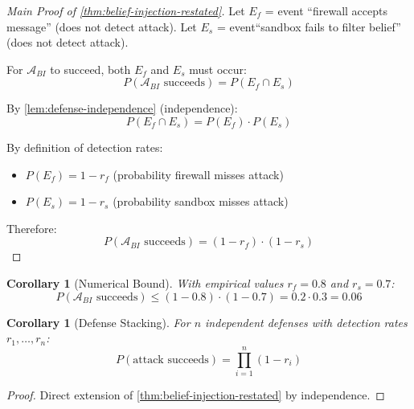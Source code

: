 \documentclass[
]{article}
\newtheorem{corollary}[theorem]{Corollary}
\begin{document}
\begin{proof}[Main Proof of \cref{thm:belief-injection-restated}]
Let $E_f$ = event ``firewall accepts message'' (does not detect attack). Let $E_s$ = event``sandbox fails to filter belief'' (does not detect attack).

For $\mathcal{A}_{BI}$ to succeed, both $E_f$ and $E_s$ must occur:
\begin{equation}
\label{eq:61-proof-1}
P(\mathcal{A}_{BI} \text{ succeeds}) = P(E_f \cap E_s)
\end{equation}

By \cref{lem:defense-independence} (independence):
\begin{equation}
\label{eq:61-proof-2}
P(E_f \cap E_s) = P(E_f) \cdot P(E_s)
\end{equation}

By definition of detection rates:
\begin{itemize}
\item $P(E_f) = 1 - r_f$ (probability firewall misses attack)
\item $P(E_s) = 1 - r_s$ (probability sandbox misses attack)
\end{itemize}

Therefore:
\begin{equation}
\label{eq:61-proof-3}
P(\mathcal{A}_{BI} \text{ succeeds}) = (1 - r_f) \cdot (1 - r_s)
\end{equation}
\end{proof}

\begin{corollary}[Numerical Bound]
\label{cor:numerical-bound}
With empirical values $r_f = 0.8$ and $r_s = 0.7$:
\begin{equation}
\label{eq:numerical-bound}
P(\mathcal{A}_{BI} \text{ succeeds}) \leq (1 - 0.8) \cdot (1 - 0.7) = 0.2 \cdot 0.3 = 0.06
\end{equation}
\end{corollary}

\begin{corollary}[Defense Stacking]
\label{cor:defense-stacking}
For $n$ independent defenses with detection rates $r_1, \ldots, r_n$:
\begin{equation}
\label{eq:defense-stacking}
P(\text{attack succeeds}) = \prod_{i=1}^{n} (1 - r_i)
\end{equation}
\end{corollary}

\begin{proof}
Direct extension of \cref{thm:belief-injection-restated} by independence.
\end{proof}
\end{document}
